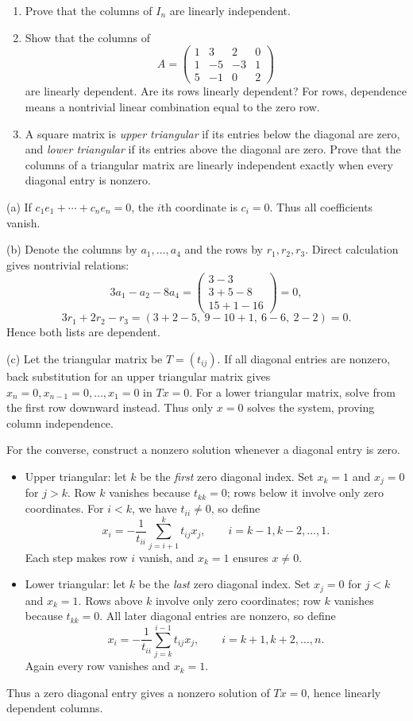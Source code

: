 \begin{problem}\label{ex:01:triangular-independence}
\begin{enumerate}
\item Prove that the columns of $I_n$ are linearly independent.
\item Show that the columns of
\[
A=\begin{pmatrix}1&3&2&0\\1&-5&-3&1\\5&-1&0&2\end{pmatrix}
\]
are linearly dependent. Are its rows linearly dependent?
For rows, dependence means a nontrivial linear combination equal to
the zero row.
\item A square matrix is \emph{upper triangular} if its entries below
the diagonal are zero, and \emph{lower triangular} if its entries above
the diagonal are zero. Prove that the columns of a triangular matrix
are linearly independent exactly when every diagonal entry is nonzero.
\end{enumerate}
\end{problem}
\begin{solution}
(a) If $c_1e_1+\cdots+c_ne_n=0$, the $i$th coordinate is $c_i=0$.
Thus all coefficients vanish.

(b) Denote the columns by $a_1,\ldots,a_4$ and the rows by
$r_1,r_2,r_3$. Direct calculation gives nontrivial relations:
\[
3a_1-a_2-8a_4
=\begin{pmatrix}3-3\\3+5-8\\15+1-16\end{pmatrix}=0,
\]
\[
3r_1+2r_2-r_3
=(3+2-5,\ 9-10+1,\ 6-6,\ 2-2)=0.
\]
Hence both lists are dependent.

(c) Let the triangular matrix be $T=(t_{ij})$.
If all diagonal entries are nonzero, back substitution for an upper
triangular matrix gives $x_n=0,x_{n-1}=0,\ldots,x_1=0$ in $Tx=0$.
For a lower triangular matrix, solve from the first row downward
instead. Thus only $x=0$ solves the system, proving column independence.

For the converse, construct a nonzero solution whenever a diagonal entry is zero.
\begin{itemize}
\item Upper triangular: let $k$ be the \emph{first} zero diagonal index.
Set $x_k=1$ and $x_j=0$ for $j>k$. Row $k$ vanishes because $t_{kk}=0$;
rows below it involve only zero coordinates. For $i<k$, we have $t_{ii}\ne0$,
so define
\[
x_i=-\frac{1}{t_{ii}}\sum_{j=i+1}^{k}t_{ij}x_j,
\qquad i=k-1,k-2,\ldots,1.
\]
Each step makes row $i$ vanish, and $x_k=1$ ensures $x\ne0$.
\item Lower triangular: let $k$ be the \emph{last} zero diagonal index.
Set $x_j=0$ for $j<k$ and $x_k=1$. Rows above $k$ involve only zero
coordinates; row $k$ vanishes because $t_{kk}=0$.
All later diagonal entries are nonzero, so define
\[
x_i=-\frac{1}{t_{ii}}\sum_{j=k}^{i-1}t_{ij}x_j,
\qquad i=k+1,k+2,\ldots,n.
\]
Again every row vanishes and $x_k=1$.
\end{itemize}
Thus a zero diagonal entry gives a nonzero solution of $Tx=0$, hence
linearly dependent columns.
\end{solution}

